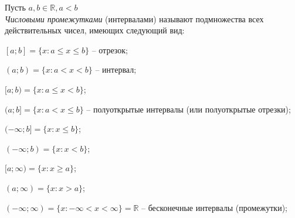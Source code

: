 \documentclass[12pt, fleqn]{article}
\begin{document}
Пусть $a, b \in \mathbb{R}, a < b$\\
\textit{Числовыми промежутками} (интервалами) называют подмножества всех действительных чисел, имеющих следующий вид: 
\begin{description}
	\item $[a;b]=\{x\colon  a \leq x \leq b\}$ -- отрезок;
	\item $(a;b)=\{x\colon  a < x < b\}$ -- интервал;
	\item $[a;b)=\{x\colon a \leq x < b\}$;
	\item $(a;b]=\{x\colon a < x \leq b\}$ -- полуоткрытые интервалы (или полуоткрытые отрезки);
	\item $(-\infty;b]=\{x\colon x\leq b\}$;
	\item $(-\infty;b)=\{x\colon x<b\}$;
	\item $[a;\infty)=\{x\colon  x\geq a\}$;
	\item $(a;\infty)=\{x\colon  x> a\}$;
	\item $(-\infty;\infty)=\{x\colon  -\infty < x < \infty\} = \mathbb{R}$ -- бесконечные интервалы (промежутки);
\end{description}
\end{document}

